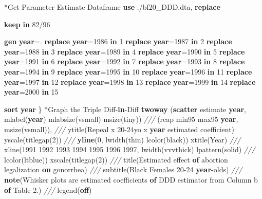 \documentclass[
]{book}
\newenvironment{Shaded}{\begin{snugshade}}{\end{snugshade}}
\newcommand{\BaseNTok}[1]{\textcolor[rgb]{0.00,0.00,0.81}{#1}}
\newcommand{\CommentTok}[1]{\textcolor[rgb]{0.56,0.35,0.01}{\textit{#1}}}
\newcommand{\FunctionTok}[1]{\textcolor[rgb]{0.13,0.29,0.53}{\textbf{#1}}}
\newcommand{\KeywordTok}[1]{\textcolor[rgb]{0.13,0.29,0.53}{\textbf{#1}}}
\newcommand{\NormalTok}[1]{#1}
\begin{document}
\begin{Shaded}
\begin{Highlighting}[]
\NormalTok{*Get Parameter Estimate Dataframe}
\KeywordTok{use}\NormalTok{ ./bf20\_DDD.dta, }\KeywordTok{replace}

\KeywordTok{keep} \KeywordTok{in}\NormalTok{ 82/96}

\KeywordTok{gen}     \FunctionTok{year}\NormalTok{=.}
\KeywordTok{replace} \FunctionTok{year}\NormalTok{=1986 }\KeywordTok{in}\NormalTok{ 1}
\KeywordTok{replace} \FunctionTok{year}\NormalTok{=1987 }\KeywordTok{in}\NormalTok{ 2}
\KeywordTok{replace} \FunctionTok{year}\NormalTok{=1988 }\KeywordTok{in}\NormalTok{ 3}
\KeywordTok{replace} \FunctionTok{year}\NormalTok{=1989 }\KeywordTok{in}\NormalTok{ 4}
\KeywordTok{replace} \FunctionTok{year}\NormalTok{=1990 }\KeywordTok{in}\NormalTok{ 5}
\KeywordTok{replace} \FunctionTok{year}\NormalTok{=1991 }\KeywordTok{in}\NormalTok{ 6}
\KeywordTok{replace} \FunctionTok{year}\NormalTok{=1992 }\KeywordTok{in}\NormalTok{ 7}
\KeywordTok{replace} \FunctionTok{year}\NormalTok{=1993 }\KeywordTok{in}\NormalTok{ 8}
\KeywordTok{replace} \FunctionTok{year}\NormalTok{=1994 }\KeywordTok{in}\NormalTok{ 9}
\KeywordTok{replace} \FunctionTok{year}\NormalTok{=1995 }\KeywordTok{in}\NormalTok{ 10}
\KeywordTok{replace} \FunctionTok{year}\NormalTok{=1996 }\KeywordTok{in}\NormalTok{ 11}
\KeywordTok{replace} \FunctionTok{year}\NormalTok{=1997 }\KeywordTok{in}\NormalTok{ 12}
\KeywordTok{replace} \FunctionTok{year}\NormalTok{=1998 }\KeywordTok{in}\NormalTok{ 13}
\KeywordTok{replace} \FunctionTok{year}\NormalTok{=1999 }\KeywordTok{in}\NormalTok{ 14}
\KeywordTok{replace} \FunctionTok{year}\NormalTok{=2000 }\KeywordTok{in}\NormalTok{ 15}

\KeywordTok{sort} \FunctionTok{year}
\NormalTok{\}}
\NormalTok{*Graph the Triple Diff{-}}\KeywordTok{in}\NormalTok{{-}Diff}
\KeywordTok{twoway}\NormalTok{ (}\KeywordTok{scatter}\NormalTok{ estimate }\FunctionTok{year}\NormalTok{, }\BaseNTok{mlabel}\NormalTok{(}\FunctionTok{year}\NormalTok{) }\BaseNTok{mlabsize}\NormalTok{(vsmall) msize(tiny)) }\CommentTok{///}
\NormalTok{ (rcap min95 max95 }\FunctionTok{year}\NormalTok{, msize(vsmall)), }\CommentTok{///}
 \BaseNTok{ytitle}\NormalTok{(Repeal x 20{-}24yo x }\FunctionTok{year}\NormalTok{ estimated coefficient) }\BaseNTok{yscale}\NormalTok{(titlegap(2)) }\CommentTok{///}
 \KeywordTok{yline}\NormalTok{(0, lwidth(thin) lcolor(}\BaseNTok{black}\NormalTok{)) }\BaseNTok{xtitle}\NormalTok{(Year) }\CommentTok{///}
 \BaseNTok{xline}\NormalTok{(1991 1992 1993 1994 1995 1996 1997, lwidth(vvvthick) lpattern(solid) }\CommentTok{///}
\NormalTok{ lcolor(}\BaseNTok{ltblue}\NormalTok{)) }\BaseNTok{xscale}\NormalTok{(titlegap(2)) }\CommentTok{///}
 \BaseNTok{title}\NormalTok{(Estimated effect }\KeywordTok{of}\NormalTok{ abortion legalization }\KeywordTok{on}\NormalTok{ gonorrhea) }\CommentTok{///}
 \BaseNTok{subtitle}\NormalTok{(Black Females 20{-}24 }\FunctionTok{year}\NormalTok{{-}olds) }\CommentTok{///}
 \KeywordTok{note}\NormalTok{(Whisker plots are estimated coefficients }\KeywordTok{of}\NormalTok{ DDD estimator from Column b }\KeywordTok{of}\NormalTok{ Table 2.) }\CommentTok{///}
 \BaseNTok{legend}\NormalTok{(}\KeywordTok{off}\NormalTok{)}
\end{Highlighting}
\end{Shaded}
\end{document}
